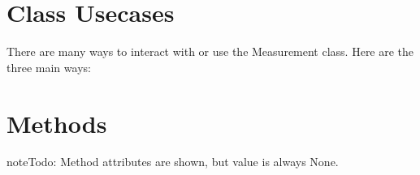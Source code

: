 \documentclass[letterpaper,10pt,english]{sphinxmanual}
\begin{document}
\section{Class Usecases}
\label{\detokenize{measurement:class-usecases}}
There are many ways to interact with or use the Measurement class. Here are the three main ways:


\section{Methods}
\label{\detokenize{measurement:methods}}
\begin{sphinxadmonition}{note}{\label{measurement:index-0}Todo:}
Method attributes are shown, but value is always None.
\end{sphinxadmonition}
\label{\detokenize{measurement:module-measurement}}
\end{document}
